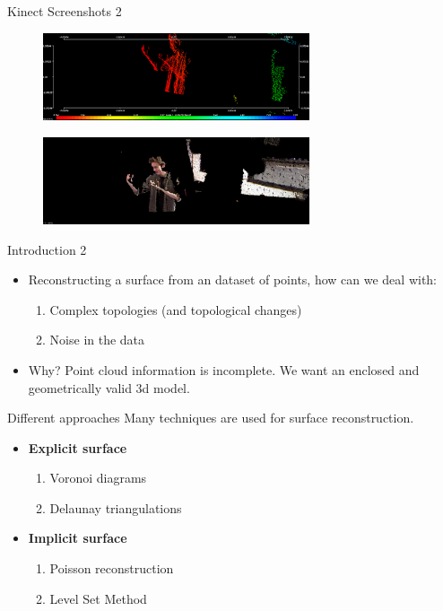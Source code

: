 \documentclass{beamer}
\begin{document}
\begin{frame}{Kinect Screenshots 2}
  \begin{figure}[H]
  \centering
  \includegraphics[width=0.7\textwidth]{img/pts.png}
  \end{figure}
  \begin{figure}[H]
  \centering
  \includegraphics[width=0.7\textwidth]{img/pcl.png}
  \end{figure}
\end{frame}

\begin{frame}{Introduction 2}
  \begin{itemize}
  \item Reconstructing a surface from an dataset of points, how can we deal with:
  \begin{enumerate}
    \item Complex topologies (and topological changes)
    \item Noise in the data
  \end{enumerate}
  \item Why? Point cloud information is incomplete. We want an enclosed and geometrically valid 3d model.
  \end{itemize}
\end{frame}

\begin{frame}{Different approaches}
  Many techniques are used for surface reconstruction.
  \begin{itemize} %
  \item \textbf{Explicit surface} %
  \begin{enumerate}
    \item Voronoi diagrams
    \item Delaunay triangulations
  \end{enumerate}
  \item \textbf{Implicit surface} %
  \begin{enumerate}
    \item Poisson reconstruction
    \item Level Set Method
  \end{enumerate}
  \end{itemize}
\end{frame}
\end{document}
